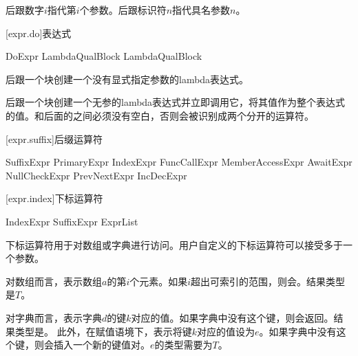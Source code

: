\pnum
\tcode{\$}后跟数字$i$指代第$i$个参数。\tcode{\$}后跟标识符$n$指代具名参数$n$。

[expr.do]{表达式}

\begin{bnf}{DoExpr}
     LambdaQual\bnfs Block \br
     LambdaQual\bnfs Block
\end{bnf}

\pnum
{}后跟一个块创建一个没有显式指定参数的lambda表达式。

\pnum
{}后跟一个块创建一个无参的lambda表达式并立即调用它，将其值作为整个表达式的值。\enternote {}和后面的\tcode{!}之间必须没有空白，否则会被识别成两个分开的运算符。\exitnote

\enterexample
{}
\exitexample

[expr.suffix]{后缀运算符}

\begin{bnf}{SuffixExpr}
    PrimaryExpr \br
    IndexExpr \br
    FuncCallExpr \br
    MemberAccessExpr \br
    AwaitExpr \br
    NullCheckExpr \br
    PrevNextExpr \br
    IncDecExpr
\end{bnf}

[expr.index]{下标运算符}

\begin{bnf}{IndexExpr}
    SuffixExpr \terminal{[} ExprList\bnfq \terminal{]}
\end{bnf}

\pnum
下标运算符用于对数组或字典进行访问。用户自定义的下标运算符可以接受多于一个参数。

\pnum
对数组而言，表示数组$a$的第$i$个元素。如果$i$超出可索引的范围，则会。结果类型是$T$。

\pnum
对字典而言，表示字典$d$的键$k$对应的值。如果字典中没有这个键，则会返回。结果类型是。
此外，在赋值语境下，表示将键$k$对应的值设为$e$。如果字典中没有这个键，则会插入一个新的键值对。$e$的类型需要为$T$。


